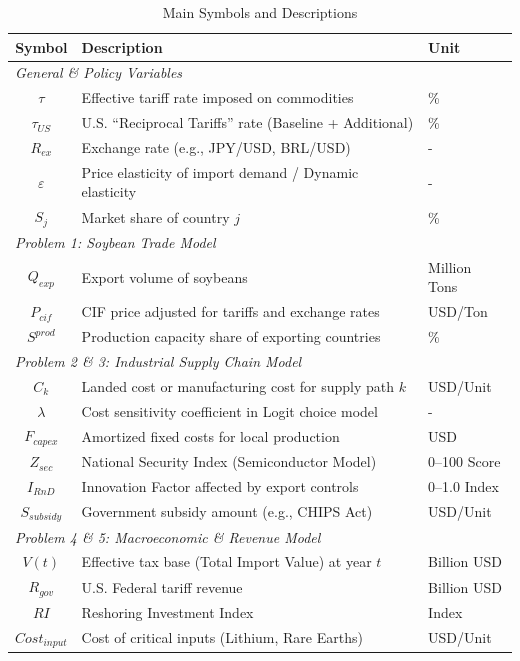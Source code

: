 \documentclass{apmcmthesis}
\begin{document}
\begin{table}[H]
\centering
\caption{Main Symbols and Descriptions}
\begin{tabular}{c >{\raggedright\arraybackslash}p{9.5cm} l}
\toprule
\textbf{Symbol} & \textbf{Description} & \textbf{Unit} \\
\midrule
\multicolumn{3}{l}{\textit{General \& Policy Variables}} \\
$\tau$ & Effective tariff rate imposed on commodities & \% \\
$\tau_{US}$ & U.S. ``Reciprocal Tariffs'' rate (Baseline + Additional) & \% \\
$R_{ex}$ & Exchange rate (e.g., JPY/USD, BRL/USD) & - \\
$\varepsilon$ & Price elasticity of import demand / Dynamic elasticity & - \\
$S_j$ & Market share of country $j$ & \% \\

\midrule
\multicolumn{3}{l}{\textit{Problem 1: Soybean Trade Model}} \\
$Q_{exp}$ & Export volume of soybeans & Million Tons \\
$P_{cif}$ & CIF price adjusted for tariffs and exchange rates & USD/Ton \\
$S^{prod}$ & Production capacity share of exporting countries & \% \\

\midrule
\multicolumn{3}{l}{\textit{Problem 2 \& 3: Industrial Supply Chain Model}} \\
$C_k$ & Landed cost or manufacturing cost for supply path $k$ & USD/Unit \\
$\lambda$ & Cost sensitivity coefficient in Logit choice model & - \\
$F_{capex}$ & Amortized fixed costs for local production & USD \\
$Z_{sec}$ & National Security Index (Semiconductor Model) & 0--100 Score \\
$I_{RnD}$ & Innovation Factor affected by export controls & 0--1.0 Index \\
$S_{subsidy}$ & Government subsidy amount (e.g., CHIPS Act) & USD/Unit \\

\midrule
\multicolumn{3}{l}{\textit{Problem 4 \& 5: Macroeconomic \& Revenue Model}} \\
$V(t)$ & Effective tax base (Total Import Value) at year $t$ & Billion USD \\
$R_{gov}$ & U.S. Federal tariff revenue & Billion USD \\
$RI$ & Reshoring Investment Index & Index \\
$Cost_{input}$ & Cost of critical inputs (Lithium, Rare Earths) & USD/Unit \\
\bottomrule
\end{tabular}
\label{tab:symbols}
\end{table}
\end{document}
